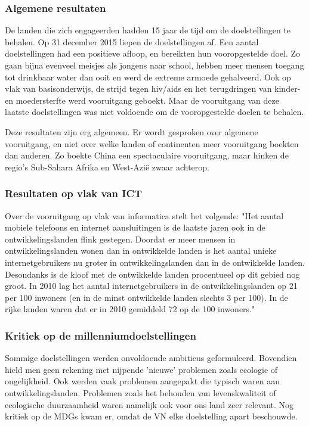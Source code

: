 \subsubsection{Algemene resultaten}
De landen die zich engageerden hadden 15 jaar de tijd om de doelstellingen te behalen. Op 31 december 2015 liepen de doelstellingen af.
Een aantal doelstellingen had een positieve afloop, en bereikten hun vooropgestelde doel. Zo gaan bijna evenveel meisjes als jongens naar school, hebben meer mensen toegang tot drinkbaar water dan ooit en werd de extreme armoede gehalveerd. Ook op vlak van basisonderwijs, de strijd tegen hiv/aids en het terugdringen van kinder- en moedersterfte werd vooruitgang geboekt. Maar de vooruitgang van deze laatste doelstellingen was niet voldoende om de vooropgestelde doelen te behalen. \autocite{Tierens2014}

Deze resultaten zijn erg algemeen. Er wordt gesproken over algemene vooruitgang, en niet over welke landen of continenten meer vooruitgang boekten dan anderen. Zo boekte China een spectaculaire vooruitgang, maar hinken de regio's Sub-Sahara Afrika en West-Azië zwaar achterop. \autocite{Tierens2014}
 
 \subsubsection{Resultaten op vlak van ICT}
Over de vooruitgang op vlak van informatica stelt \autocite{Kampherbeek2012} het volgende: "Het aantal mobiele telefoons en internet aansluitingen is de laatste jaren ook in de ontwikkelingslanden flink gestegen. Doordat er meer mensen in ontwikkelingslanden wonen dan in ontwikkelde landen is het aantal unieke internetgebruikers nu groter in ontwikkelingslanden dan in de ontwikkelde landen. Desondanks is de kloof met de ontwikkelde landen procentueel op dit gebied nog groot. In 2010 lag het aantal internetgebruikers in de ontwikkelingslanden op 21 per 100 inwoners (en in de minst ontwikkelde landen slechts 3 per 100). In de rijke landen waren dat er in 2010 gemiddeld 72 op de 100 inwoners."
 
 \subsubsection{Kritiek op de millenniumdoelstellingen}
 Sommige doelstellingen werden onvoldoende ambitieus geformuleerd. Bovendien hield men geen rekening met nijpende 'nieuwe' problemen zoals ecologie of ongelijkheid. Ook werden vaak problemen aangepakt die typisch waren aan ontwikkelingslanden. Problemen zoals het behouden van levenskwaliteit of ecologische duurzaamheid waren namelijk ook voor ons land zeer relevant. Nog kritiek op de MDGs kwam er, omdat de VN elke doelstelling apart beschouwde. \autocite{VN2015}

